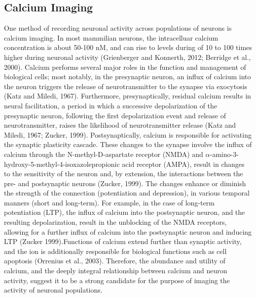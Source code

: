\documentclass[11pt,titlepage]{article}
\begin{document}
\subsection{Calcium Imaging}

One method of recording neuronal activity across populations of neurons is calcium imaging. In most mammilian neurons, the intracelluar calcium concentration is about 50-100 nM, and can rise to levels during of 10 to 100 times higher during neuronal activity (Grienberger and Konnerth, 2012; Berridge et al., 2000). Calcium performs several major roles in the function and management of biological cells; most notably, in the presynaptic neuron, an influx of calcium into the neuron triggers the release of neurotransmitter to the synapse via exocytosis (Katz and Miledi, 1967). Furthermore, presynaptically, residual calcium results in neural facilitation, a period in which a successive depolarization of the presynaptic neuron, following the first depolarization event and release of neurotransmitter, raises the likelihood of neurotransmitter release (Katz and Miledi, 1967; Zucker, 1999). Postsynaptically, calcium is responsible for activating the synaptic plasticity cascade. These changes to the synapse involve the influx of calcium through the N-methyl-D-aspartate receptor (NMDA) and $\alpha$-amino-3-hydroxy-5-methyl-4-isoxazolepropionic acid receptor (AMPA), result in changes to the sensitivity of the neuron and, by extension, the interactions between the pre- and postsynaptic neurons (Zucker, 1999). The changes enhance or diminish the strength of the connection (potentiation and depression), in various temporal manners (short and long-term). For example, in the case of long-term potentiation (LTP), the influx of calcium into the postsynaptic neuron, and the resulting depolarization, result in the unblocking of the NMDA receptors, allowing for a further influx of calcium into the postsynaptic neuron and inducing LTP (Zucker 1999).Functions of calcium extend further than synaptic activity, and the ion is additionally responsible for biological functions such as cell apoptosis (Orrenius et al., 2003). Therefore, the abundance and utility of calcium, and the deeply integral relationship between calcium and neuron activity, suggest it to be a strong candidate for the purpose of imaging the activity of neuronal populations.\par
\end{document}
